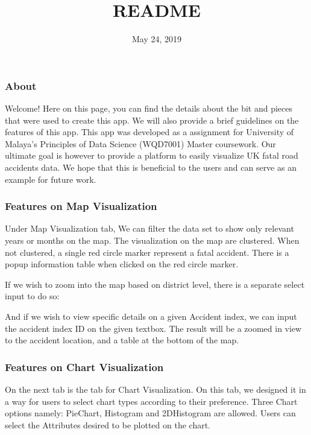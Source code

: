 \documentclass[]{article}
\title{README}
\author{}
\date{May 24, 2019}
\begin{document}
\maketitle

\subsubsection{About}\label{about}

Welcome! Here on this page, you can find the details about the bit and
pieces that were used to create this app. We will also provide a brief
guidelines on the features of this app. This app was developed as a
assignment for University of Malaya's Principles of Data Science
(WQD7001) Master coursework. Our ultimate goal is however to provide a
platform to easily visualize UK fatal road accidents data. We hope that
this is beneficial to the users and can serve as an example for future
work.

\subsubsection{Features on Map
Visualization}\label{features-on-map-visualization}

Under Map Visualization tab, We can filter the data set to show only
relevant years or months on the map. The visualization on the map are
clustered. When not clustered, a single red circle marker represent a
fatal accident. There is a popup information table when clicked on the
red circle marker.

If we wish to zoom into the map based on district level, there is a
separate select input to do so:

And if we wish to view specific details on a given Accident index, we
can input the accident index ID on the given textbox. The result will be
a zoomed in view to the accident location, and a table at the bottom of
the map.

\subsubsection{Features on Chart
Visualization}\label{features-on-chart-visualization}

On the next tab is the tab for Chart Visualization. On this tab, we
designed it in a way for users to select chart types according to their
preference. Three Chart options namely: PieChart, Histogram and
2DHistogram are allowed. Users can select the Attributes desired to be
plotted on the chart.
\end{document}
